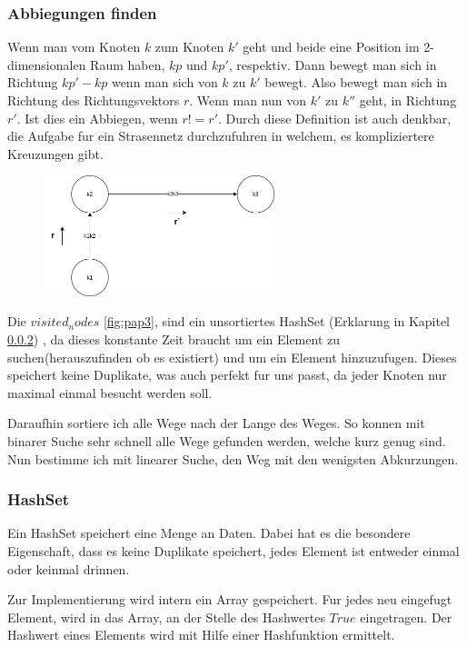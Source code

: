 \documentclass[a4paper,12pt,arial]{scrartcl}
\begin{document}
\newpage
\subsubsection{Abbiegungen finden}
Wenn man vom Knoten $k$ zum Knoten $k'$ geht und beide eine Position im 2-dimensionalen Raum haben, $kp$ und $kp'$, respektiv.
Dann bewegt man sich in Richtung $kp'-kp$ wenn man sich von  $k$ zu $k'$ bewegt. Also bewegt man sich in Richtung des Richtungsvektors $r$. Wenn man nun von $k'$ zu $k''$ geht, in Richtung $r'$.
Ist dies ein Abbiegen, wenn $r != r'$.
Durch diese Definition ist auch denkbar, die Aufgabe fur ein Strasennetz durchzufuhren in welchem, es kompliziertere Kreuzungen gibt.
\begin{figure}[h!]
    \centering
    \includegraphics[width=0.6\textwidth]{AbbiegenBWinf.png}
    \caption{}
    \label{fig:abbiegen}
\end{figure}


Die $visited_nodes$ \ref{fig:pap3}, sind ein unsortiertes HashSet (Erklarung in Kapitel \ref{sec:HashSet}) , da dieses konstante Zeit braucht um ein Element zu suchen(herauszufinden ob es existiert) und um ein Element hinzuzufugen.
Dieses speichert keine Duplikate, was auch perfekt fur uns passt, da jeder Knoten nur maximal einmal besucht werden soll.
\par
Daraufhin sortiere ich alle Wege nach der Lange des Weges. So konnen mit binarer Suche sehr schnell alle Wege gefunden werden, welche kurz genug sind. Nun bestimme ich mit linearer Suche, den Weg mit den wenigsten Abkurzungen.
\subsubsection{HashSet}\label{sec:HashSet}
Ein HashSet speichert eine Menge an Daten. Dabei hat es die besondere Eigenschaft, dass es keine Duplikate speichert, jedes Element ist entweder einmal oder keinmal drinnen.

Zur Implementierung wird intern ein Array gespeichert. Fur jedes neu eingefugt Element, wird in das Array, an der Stelle des Hashwertes  $True$ eingetragen.
Der Hashwert eines Elements wird mit Hilfe einer Hashfunktion ermittelt.
\end{document}
